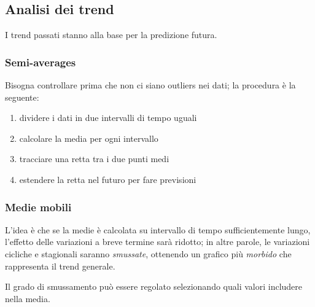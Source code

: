 \documentclass{report}
\begin{document}
\subsection{Analisi dei trend}

I trend passati stanno alla base per la predizione futura.

\subsubsection{Semi-averages}
Bisogna controllare prima che non ci siano outliers nei dati; la procedura è la seguente:
\begin{enumerate}
    \item dividere i dati in due intervalli di tempo uguali 
    \item calcolare la media per ogni intervallo 
    \item tracciare una retta tra i due punti medi 
    \item estendere la retta nel futuro per fare previsioni 
\end{enumerate}


\subsubsection{Medie mobili}
L'idea è che se la medie è calcolata su intervallo di tempo sufficientemente lungo, l'effetto delle variazioni a breve termine sarà ridotto; in 
altre parole, le variazioni cicliche e stagionali saranno \textit{smussate}, ottenendo un grafico più \textit{morbido} che rappresenta 
il trend generale. 

\noindent Il grado di smussamento può essere regolato selezionando quali valori includere nella media.
\end{document}
